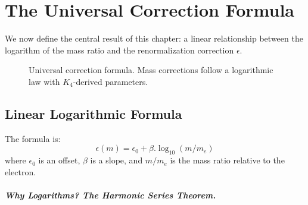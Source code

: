 \documentclass[11pt,a4paper]{book}
\def\cdot{.}%
\begin{document}
\chapter{The Universal Correction Formula}
\label{chap:universal-correction}

We now define the central result of this chapter: a linear relationship between the logarithm of the mass ratio and the renormalization correction $\epsilon$.

\begin{figure}[h]
\centering
{}
\caption{Universal correction formula. Mass corrections follow a logarithmic law with $K_4$-derived parameters.}
\label{fig:universal-correction}
\end{figure}

\section{Linear Logarithmic Formula}

The formula is:
\[
\epsilon(m) = \epsilon_0 + \beta \cdot \log_{10}(m / m_e)
\]
where $\epsilon_0$ is an offset, $\beta$ is a slope, and $m / m_e$ is the mass ratio relative to the electron.

\paragraph{Why Logarithms? The Harmonic Series Theorem.}
\end{document}
